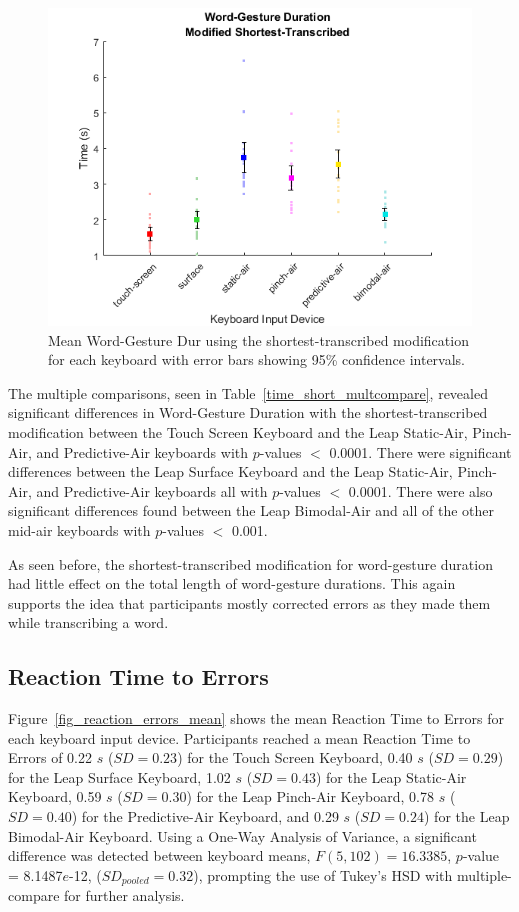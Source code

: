 \begin{figure}[h]
	\centering
	\includegraphics{fig_time_short_mean}
	\caption[Mean Word-Gesture Duration for Modified-Shortest]{Mean Word-Gesture Dur using the shortest-transcribed modification for each keyboard with error bars showing 95\% confidence intervals.}
	\label{fig_time_short_mean}
\end{figure}

The multiple comparisons, seen in Table~\ref{time_short_multcompare}, revealed significant differences in Word-Gesture Duration with the shortest-transcribed modification between the Touch Screen Keyboard and the Leap Static-Air, Pinch-Air, and Predictive-Air keyboards with $p$-values $<$ 0.0001. There were significant differences between the Leap Surface Keyboard and the Leap Static-Air, Pinch-Air, and Predictive-Air keyboards all with $p$-values $<$ 0.0001. There were also significant differences found between the Leap Bimodal-Air and all of the other mid-air keyboards with $p$-values $<$ 0.001.

As seen before, the shortest-transcribed modification for word-gesture duration had little effect on the total length of word-gesture durations. This again supports the idea that participants mostly corrected errors as they made them while transcribing a word.

\subsection{Reaction Time to Errors}
Figure~\ref{fig_reaction_errors_mean} shows the mean Reaction Time to Errors for each keyboard input device. Participants reached a mean Reaction Time to Errors of 0.22 $s$ ($SD = 0.23$) for the Touch Screen Keyboard, 0.40 $s$ ($SD = 0.29$) for the Leap Surface Keyboard, 1.02 $s$ ($SD = 0.43$) for the Leap Static-Air Keyboard, 0.59 $s$ ($SD = 0.30$) for the Leap Pinch-Air Keyboard, 0.78 $s$ ($SD = 0.40$) for the Predictive-Air Keyboard, and 0.29 $s$ ($SD = 0.24$) for the Leap Bimodal-Air Keyboard. Using a One-Way Analysis of Variance, a significant difference was detected between keyboard means, $F(5, 102) = 16.3385$, $p$-value = 8.1487$e$-12, ($SD_{pooled} = 0.32$), prompting the use of Tukey's HSD with multiple-compare for further analysis.

